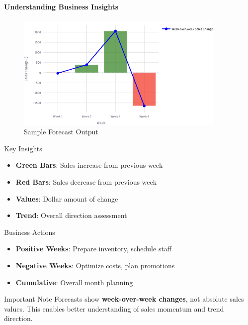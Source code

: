 { 
	\framesubtitle{Understanding Business Insights}
	
	\begin{figure}
		\centering
			\includegraphics[width=0.9\textwidth]{images/resultsDemo/ExamplePlot.png}
		\caption{Sample Forecast Output}
	\end{figure}
	
	\begin{block}{Key Insights}
		\begin{itemize}
			\item \textbf{Green Bars}: Sales increase from previous week
			\item \textbf{Red Bars}: Sales decrease from previous week
			\item \textbf{Values}: Dollar amount of change
			\item \textbf{Trend}: Overall direction assessment
		\end{itemize}
	\end{block}
	
	\begin{block}{Business Actions}
		\begin{itemize}
			\item \textbf{Positive Weeks}: Prepare inventory, schedule staff
			\item \textbf{Negative Weeks}: Optimize costs, plan promotions
			\item \textbf{Cumulative}: Overall month planning
		\end{itemize}
	\end{block}
	
	\begin{alertblock}{Important Note}
		Forecasts show \textbf{week-over-week changes}, not absolute sales values. 
		This enables better understanding of sales momentum and trend direction.
	\end{alertblock}
}

